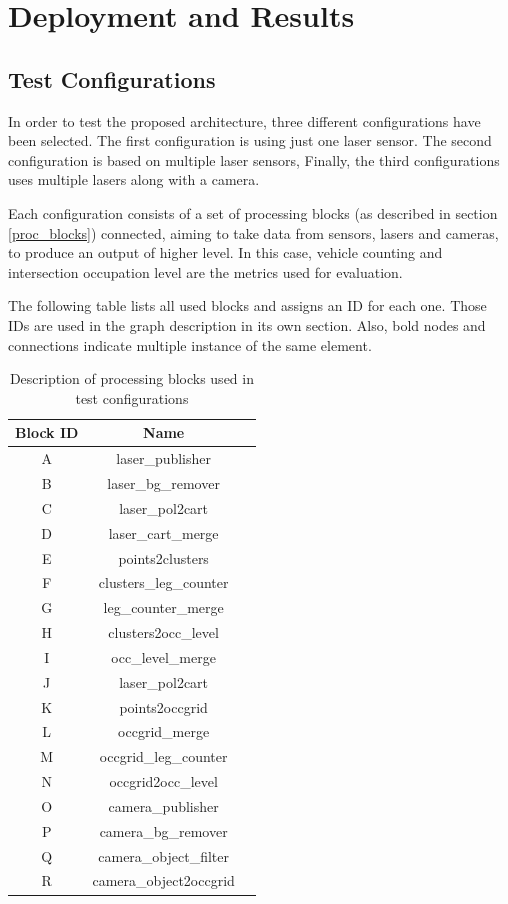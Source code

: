 \chapter [Deployment and Results]{Deployment and Results}

\section{Test Configurations}
In order to test the proposed architecture, three different configurations have been selected. The first configuration is using just one laser sensor. The second configuration is based on multiple laser sensors, Finally, the third configurations uses multiple lasers along with a camera.

Each configuration consists of a set of processing blocks (as described in section \ref{proc_blocks}) connected, aiming to take data from sensors, lasers and cameras, to produce an output of higher level. In this case, vehicle counting and intersection occupation level are the metrics used for evaluation.

The following table lists all used blocks and assigns an ID for each one. Those IDs are used in the graph description in its own section. Also, bold nodes and connections indicate multiple instance of the same element.

\begin{table}[ht!]
\footnotesize
\centering
\begin{tabular}{|c | c| c|}
\hline
\textbf{Block ID} & \textbf{Name} \\
\hline
A & laser\_publisher \\
\hline
B & laser\_bg\_remover \\
\hline
C & laser\_pol2cart \\
\hline
D & laser\_cart\_merge \\
\hline
E & points2clusters \\
\hline
F & clusters\_leg\_counter \\
\hline
G & leg\_counter\_merge \\
\hline
H & clusters2occ\_level \\
\hline
I & occ\_level\_merge \\
\hline
J & laser\_pol2cart \\
\hline
K & points2occgrid \\
\hline
L & occgrid\_merge \\
\hline
M & occgrid\_leg\_counter \\
\hline
N & occgrid2occ\_level \\
\hline
O & camera\_publisher \\
\hline
P & camera\_bg\_remover \\
\hline
Q & camera\_object\_filter \\
\hline
R & camera\_object2occgrid \\
\hline
\end{tabular}
\caption{Description of processing blocks used in test configurations}
\label{desc_test_config}
\end{table}


